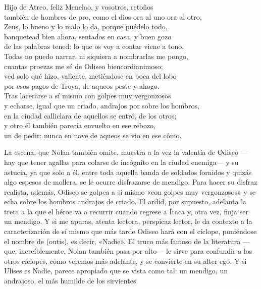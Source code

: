 \begin{versocita}
Hijo de Atreo, feliz Menelao, y vosotros, retoños\\
también de hombres de pro, como el dios ora al uno ora al otro,\\
Zeus, lo bueno y lo malo lo da, porque puédelo todo,\\
banquetead bien ahora, sentados en casa, y buen gozo\\
de las palabras tened: lo que os voy a contar viene a tono.\\
Todas no puedo narrar, ni siquiera a nombrarlas me pongo,\\
cuantas proezas me sé de Odiseo biencordianimoso;\\
ved solo qué hizo, valiente, metiéndose en boca del lobo\\
por esos pagos de Troya, de aqueos peste y ahogo.\\
Tras lacerarse a sí mismo con golpes muy vergonzosos\\
y echarse, igual que un criado, andrajos por sobre los hombros,\\
en la ciudad calliclara de aquellos se entró, de los otros;\\
y otro él también parecía envuelto en ese rebozo,\\
un de pedir: nunca en nave de aqueos se vio en ese cómo.
\end{versocita}

La escena, que Nolan también omite, muestra a la vez la valentía de Odiseo ---hay que tener agallas para colarse de incógnito en la ciudad enemiga--- y su astucia, ya que solo a él, entre toda aquella banda de soldados fornidos y quizás algo espesos de mollera, se le ocurre disfrazarse de mendigo. Para hacer su disfraz realista, además, Odiseo se golpea a sí mismo «con golpes muy vergonzosos» y se echa sobre los hombros andrajos de criado. El ardid, por supuesto, adelanta la treta a la que el héroe va a recurrir cuando regrese a Ítaca y, otra vez, finja ser un mendigo. Y si me apuras, atenta lectora, perspicaz lector, le da contexto a la caracterización de sí mismo que más tarde Odiseo hará con el cíclope, poniéndose el nombre de  (outis), es decir, «Nadie». El truco más famoso de la literatura ---que, increíblemente, Nolan también pasa por alto--- le sirve para confundir a los otros cíclopes, como veremos más adelante, y se convierte en su alter ego. Y si Ulises es Nadie, parece apropiado que se vista como tal: un mendigo, un andrajoso, el más humilde de los sirvientes.

